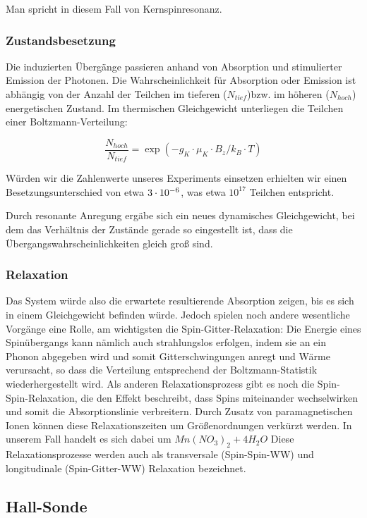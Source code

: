 Man spricht in diesem Fall von Kernspinresonanz. 

\subsubsection{Zustandsbesetzung}

Die induzierten Übergänge passieren anhand von Absorption und stimulierter Emission der Photonen. Die Wahrscheinlichkeit für Absorption oder Emission ist abhängig von der Anzahl der Teilchen im tieferen ($N_{tief}$)bzw. im höheren ($N_{hoch}$) energetischen Zustand. Im thermischen Gleichgewicht unterliegen die Teilchen einer Boltzmann-Verteilung:

$$\frac{N_{hoch}}{N_{tief}} = \exp(-g_K\cdot\mu_K\cdot B_z/k_B\cdot T)$$

Würden wir die Zahlenwerte unseres Experiments einsetzen erhielten wir einen Besetzungsunterschied von etwa $3\cdot 10^{-6}$, was etwa $10^{17}$ Teilchen entspricht.

Durch resonante Anregung ergäbe sich ein neues dynamisches Gleichgewicht, bei dem das Verhältnis der Zustände gerade so eingestellt ist, dass die Übergangswahrscheinlichkeiten gleich groß sind. 

\subsubsection{Relaxation}

Das System würde also die erwartete resultierende Absorption zeigen, bis es sich in einem Gleichgewicht befinden würde. Jedoch spielen noch andere wesentliche Vorgänge eine Rolle, am wichtigsten die Spin-Gitter-Relaxation:
Die Energie eines Spinübergangs kann nämlich auch strahlungslos erfolgen, indem sie an ein Phonon abgegeben wird und somit Gitterschwingungen anregt und Wärme verursacht, so dass die Verteilung entsprechend der Boltzmann-Statistik wiederhergestellt wird.
Als anderen Relaxationsprozess gibt es noch die Spin-Spin-Relaxation, die den Effekt beschreibt, dass Spins miteinander wechselwirken und somit die Absorptionslinie verbreitern. 
Durch Zusatz von paramagnetischen Ionen können diese Relaxationszeiten um Größenordnungen verkürzt werden. In unserem Fall handelt es sich dabei um $Mn(NO_3)_2 + 4 H_2O$
Diese Relaxationsprozesse werden auch als transversale (Spin-Spin-WW) und longitudinale (Spin-Gitter-WW) Relaxation bezeichnet.

\subsection{Hall-Sonde}

